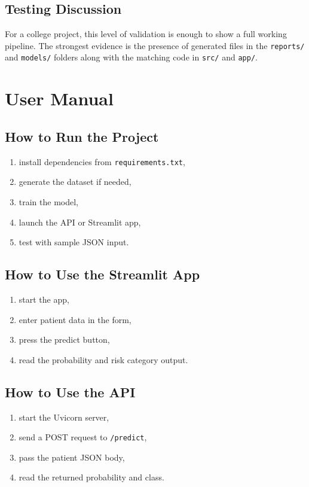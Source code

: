 \documentclass[12pt,a4paper,openany]{report}
\begin{document}
    \section{Testing Discussion}
    For a college project, this level of validation is enough to show a full working pipeline. The strongest evidence is the presence of generated files in the \texttt{reports/} and \texttt{models/} folders along with the matching code in \texttt{src/} and \texttt{app/}.

    \chapter{User Manual}
    \section{How to Run the Project}
    \begin{enumerate}[leftmargin=1.4cm]
    \item install dependencies from \texttt{requirements.txt},
    \item generate the dataset if needed,
    \item train the model,
    \item launch the API or Streamlit app,
    \item test with sample JSON input.
    \end{enumerate}

    \section{How to Use the Streamlit App}
    \begin{enumerate}[leftmargin=1.4cm]
    \item start the app,
    \item enter patient data in the form,
    \item press the predict button,
    \item read the probability and risk category output.
    \end{enumerate}

    \section{How to Use the API}
    \begin{enumerate}[leftmargin=1.4cm]
    \item start the Uvicorn server,
    \item send a POST request to \texttt{/predict},
    \item pass the patient JSON body,
    \item read the returned probability and class.
    \end{enumerate}
\end{document}
